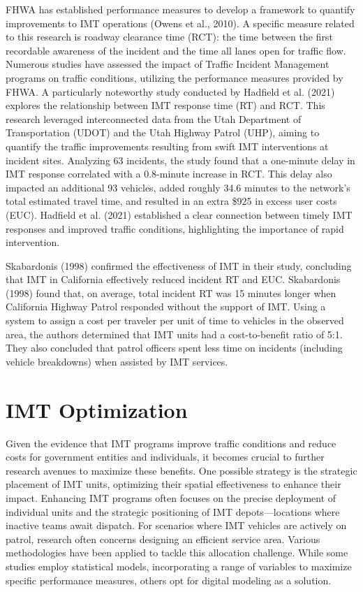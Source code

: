 \documentclass[fancy, oneside, mastersfancy, ms]{byuthesis}
\begin{document}
FHWA has established performance measures to develop a framework to
quantify improvements to IMT operations (Owens et al., 2010). A specific
measure related to this research is roadway clearance time (RCT): the
time between the first recordable awareness of the incident and the time
all lanes open for traffic flow. Numerous studies have assessed the
impact of Traffic Incident Management programs on traffic conditions,
utilizing the performance measures provided by FHWA. A particularly
noteworthy study conducted by Hadfield et al. (2021) explores the
relationship between IMT response time (RT) and RCT. This research
leveraged interconnected data from the Utah Department of Transportation
(UDOT) and the Utah Highway Patrol (UHP), aiming to quantify the traffic
improvements resulting from swift IMT interventions at incident sites.
Analyzing 63 incidents, the study found that a one-minute delay in IMT
response correlated with a 0.8-minute increase in RCT. This delay also
impacted an additional 93 vehicles, added roughly 34.6 minutes to the
network's total estimated travel time, and resulted in an extra \$925 in
excess user costs (EUC). Hadfield et al. (2021) established a clear
connection between timely IMT responses and improved traffic conditions,
highlighting the importance of rapid intervention.

Skabardonis (1998) confirmed the effectiveness of IMT in their study,
concluding that IMT in California effectively reduced incident RT and
EUC. Skabardonis (1998) found that, on average, total incident RT was 15
minutes longer when California Highway Patrol responded without the
support of IMT. Using a system to assign a cost per traveler per unit of
time to vehicles in the observed area, the authors determined that IMT
units had a cost-to-benefit ratio of 5:1. They also concluded that
patrol officers spent less time on incidents (including vehicle
breakdowns) when assisted by IMT services.

\hypertarget{sec-lit_imt_opt}{%
\section{IMT Optimization}\label{sec-lit_imt_opt}}

Given the evidence that IMT programs improve traffic conditions and
reduce costs for government entities and individuals, it becomes crucial
to further research avenues to maximize these benefits. One possible
strategy is the strategic placement of IMT units, optimizing their
spatial effectiveness to enhance their impact. Enhancing IMT programs
often focuses on the precise deployment of individual units and the
strategic positioning of IMT depots---locations where inactive teams
await dispatch. For scenarios where IMT vehicles are actively on patrol,
research often concerns designing an efficient service area. Various
methodologies have been applied to tackle this allocation challenge.
While some studies employ statistical models, incorporating a range of
variables to maximize specific performance measures, others opt for
digital modeling as a solution.
\end{document}
